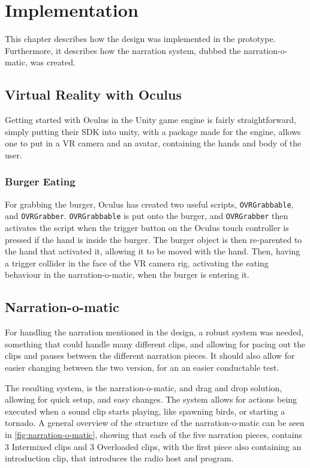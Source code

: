 \chapter{Implementation}
This chapter describes how the design was implemented in the prototype. Furthermore, it describes how the narration system, dubbed the narration-o-matic, was created.

\section{Virtual Reality with Oculus}
    Getting started with Oculus in the Unity game engine is fairly straightforward, simply putting their SDK into unity, with a package made for the engine, allows one to put in a VR camera and an avatar, containing the hands and body of the user.
    \subsection{Burger Eating}
        For grabbing the burger, Oculus has created two useful scripts, \texttt{OVRGrabbable}, and \texttt{OVRGrabber}. \texttt{OVRGrabbable} is put onto the burger, and \texttt{OVRGrabber} then activates the script when the trigger button on the Oculus touch controller is pressed if the hand is inside the burger. The burger object is then re-parented to the hand that activated it, allowing it to be moved with the hand. Then, having a trigger collider in the face of the VR camera rig, activating the eating behaviour in the narration-o-matic, when the burger is entering it.


\section{Narration-o-matic}
    For handling the narration mentioned in the design, a robust system was needed, something that could handle many different clips, and allowing for pacing out the clips and pauses between the different narration pieces. It should also allow for easier changing between the two version, for an an easier conductable test.
    
    The resulting system, is the narration-o-matic, and drag and drop solution, allowing for quick setup, and easy changes. The system allows for actions being executed when a sound clip starts playing, like spawning birds, or starting a tornado. A general overview of the structure of the narration-o-matic can be seen in \autoref{fig:narration-o-matic}, showing that each of the five narration pieces, contains 3 Intermixed clips and 3 Overloaded clips, with the first piece also containing an introduction clip, that introduces the radio host and program.
    
